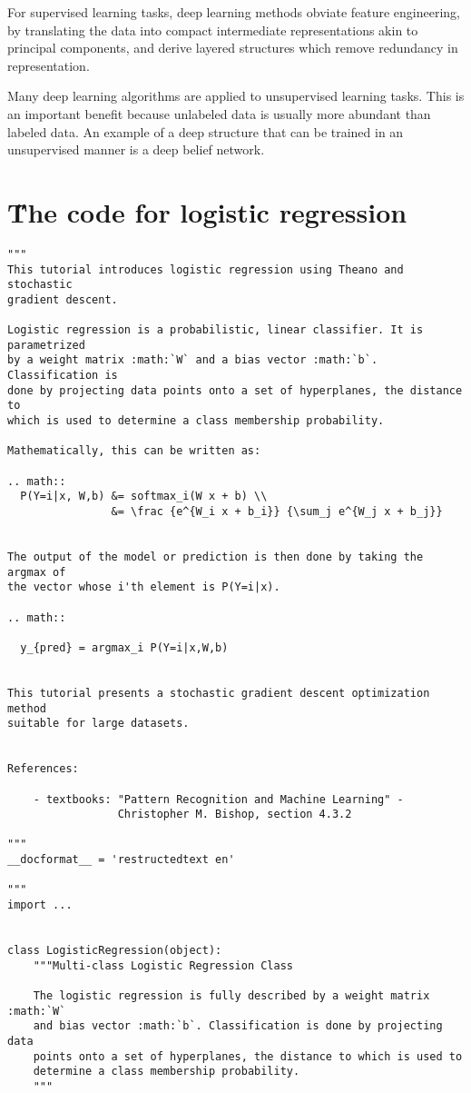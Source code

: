 \documentclass[12pt]{article}
\begin{document}
For supervised learning tasks, deep learning methods obviate feature engineering, by translating the data into compact intermediate representations akin to principal components, and derive layered structures which remove redundancy in representation.

Many deep learning algorithms are applied to unsupervised learning tasks. This is an important benefit because unlabeled data is usually more abundant than labeled data. An example of a deep structure that can be trained in an unsupervised manner is a deep belief network.

\section{\H The code for logistic regression}
\begin{lstlisting}
"""
This tutorial introduces logistic regression using Theano and stochastic
gradient descent.

Logistic regression is a probabilistic, linear classifier. It is parametrized
by a weight matrix :math:`W` and a bias vector :math:`b`. Classification is
done by projecting data points onto a set of hyperplanes, the distance to
which is used to determine a class membership probability.

Mathematically, this can be written as:

.. math::
  P(Y=i|x, W,b) &= softmax_i(W x + b) \\
                &= \frac {e^{W_i x + b_i}} {\sum_j e^{W_j x + b_j}}


The output of the model or prediction is then done by taking the argmax of
the vector whose i'th element is P(Y=i|x).

.. math::

  y_{pred} = argmax_i P(Y=i|x,W,b)


This tutorial presents a stochastic gradient descent optimization method
suitable for large datasets.


References:

    - textbooks: "Pattern Recognition and Machine Learning" -
                 Christopher M. Bishop, section 4.3.2

"""
__docformat__ = 'restructedtext en'

"""
import ...


class LogisticRegression(object):
    """Multi-class Logistic Regression Class

    The logistic regression is fully described by a weight matrix :math:`W`
    and bias vector :math:`b`. Classification is done by projecting data
    points onto a set of hyperplanes, the distance to which is used to
    determine a class membership probability.
    """


\end{lstlisting}
\end{document}
